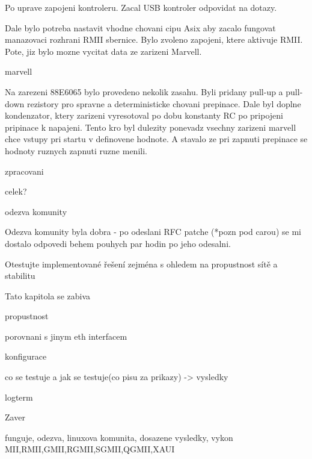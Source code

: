 Po uprave zapojeni kontroleru. Zacal USB kontroler odpovidat na dotazy.

Dale bylo potreba nastavit vhodne chovani cipu Asix aby zacalo fungovat manazovaci rozhrani RMII sbernice. Bylo zvoleno zapojeni, ktere aktivuje RMII. Pote, jiz bylo mozne vycitat data ze zarizeni Marvell.

\secc marvell

Na zarezeni 88E6065 bylo provedeno nekolik zasahu. Byli pridany pull-up a pull-down rezistory pro spravne a deterministicke chovani prepinace.
Dale byl doplne kondenzator, ktery zarizeni vyresotoval po dobu konstanty RC po pripojeni pripinace k napajeni. Tento kro byl dulezity ponevadz vsechny zarizeni marvell chce vstupy pri startu v definovene hodnote. A stavalo ze pri zapnuti prepinace se hodnoty ruznych zapnuti ruzne menili.

\sec zpracovani

\sec celek?

\sec odezva komunity

Odezva komunity byla dobra - po odeslani RFC patche (*pozn pod carou) se mi dostalo odpovedi behem pouhych par hodin po jeho odesalni.

\chap Otestujte implementované řešení zejména s ohledem na propustnost sítě a stabilitu

Tato kapitola se zabiva

\sec propustnost

\sec porovnani s jinym eth interfacem

\sec konfigurace 

co se testuje a jak se testuje(co pisu za prikazy) -> vysledky

\sec logterm

\chap Zaver

funguje, odezva, linuxova komunita, dosazene vysledky, vykon
MII,RMII,GMII,RGMII,SGMII,QGMII,XAUI
